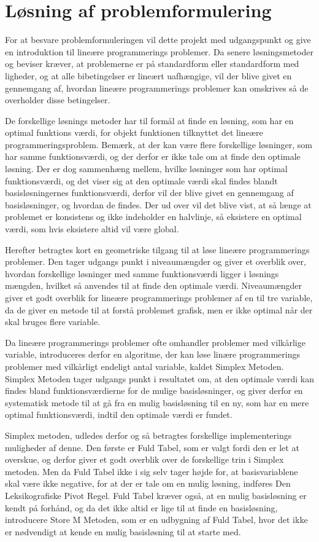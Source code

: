 \section{Løsning af problemformulering}
For at besvare problemformuleringen vil dette projekt med udgangspunkt \citep{bert} og \citep{lay} give en introduktion til lineære programmerings problemer. 
Da senere løsningsmetoder og beviser kræver, at problemerne er på standardform eller standardform med ligheder, og at alle bibetingelser er lineært uafhængige, vil der blive givet en gennemgang af, hvordan lineære programmerings problemer kan omskrives så de overholder disse betingelser.

De forskellige løsnings metoder har til formål at finde en løsning, som har en optimal funktions værdi, for objekt funktionen tilknyttet det lineære programmeringsproblem.
Bemærk, at der kan være flere forskellige løsninger, som har samme funktionsværdi, og der derfor er ikke tale om at finde den optimale løsning. 
Der er dog sammenhæng mellem, hvilke løsninger som har optimal funktionsværdi, og det viser sig at den optimale værdi skal findes blandt basisløsningernes funktionsværdi, derfor vil der blive givet en gennemgang af basisløsninger, og hvordan de findes.
Der ud over vil det blive vist, at så længe at problemet er konsistens og ikke indeholder en halvlinje, så eksistere en optimal værdi, som hvis eksistere altid vil være global.

Herefter betragtes kort en geometriske tilgang til at løse lineære programmerings problemer.
Den tager udgangs punkt i niveaumængder og giver et overblik over, hvordan forskellige løsninger med samme funktionsværdi ligger i løsnings mængden, hvilket så anvendes til at finde den optimale værdi. 
Niveaumængder giver et godt overblik for lineære programmerings problemer af en til tre variable, da de giver en metode til at forstå problemet grafisk, men er ikke optimal når der skal bruges flere variable.

Da lineære programmerings problemer ofte omhandler problemer med vilkårlige variable, introduceres derfor en algoritme, der kan løse linære programmerings problemer med vilkårligt endeligt antal variable, kaldet Simplex Metoden.
Simplex Metoden tager udgangs punkt i resultatet om, at den optimale værdi kan findes bland funktionsværdierne for de mulige basisløsninger, og giver derfor en systematisk metode til at gå fra en mulig basisløsning til en ny, som har en mere optimal funktionsværdi, indtil den optimale værdi er fundet.

Simplex metoden, udledes derfor og så betragtes forskellige implementerings muligheder af denne.
Den første er Fuld Tabel, som er valgt fordi den er let at overskue, og derfor giver et godt overblik over de forskellige trin i Simplex metoden.
Men da Fuld Tabel ikke i sig selv tager højde for, at basisvariablene skal være ikke negative, for at der er tale om en mulig løsning, indføres Den Leksikografiske Pivot Regel.
Fuld Tabel kræver også, at en mulig basisløsning er kendt på forhånd, og da det ikke altid er lige til at finde en basisløsning, introducere Store M Metoden, som er en udbygning af Fuld Tabel, hvor det ikke er nødvendigt at kende en mulig basisløsning til at starte med.


